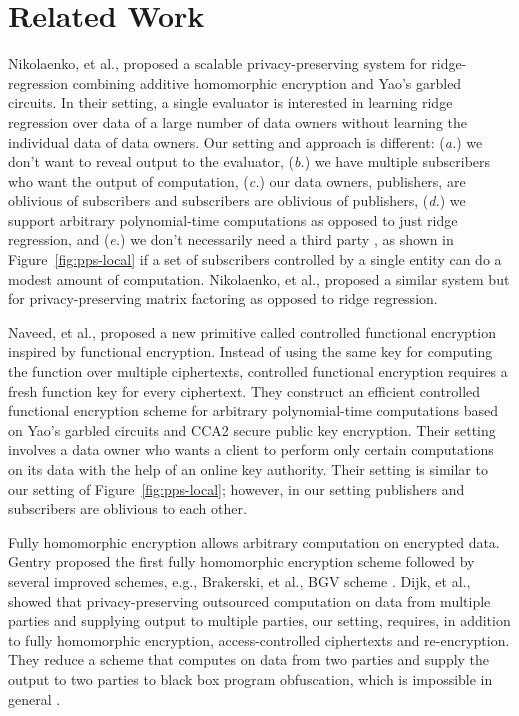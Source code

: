 \section{Related Work}
\label{sec:related}

Nikolaenko, et al., \cite{nikolaenko2013privacy} proposed a scalable
privacy-preserving system for ridge-regression combining additive homomorphic
encryption and Yao's garbled circuits.  In their setting, a single evaluator is
interested in learning ridge regression over data of a large number of data
owners without learning the individual data of data owners. Our setting and
approach is different: (\emph{a.}) we don't want to reveal output to the
evaluator, (\emph{b.}) we have multiple subscribers who want the output of
computation, (\emph{c.}) our data owners, publishers, are oblivious of
subscribers and subscribers are oblivious of publishers, (\emph{d.}) we support
arbitrary polynomial-time computations as opposed to just ridge regression, and
(\emph{e.}) we don't necessarily need a third party \garbler, as shown in
Figure~\ref{fig:pps-local} if a set of subscribers controlled by a single
entity can do a modest amount of computation. Nikolaenko, et
al.,\cite{nikolaenko2013privacy} proposed a similar system but for
privacy-preserving matrix factoring as opposed to ridge regression.

Naveed, et al., \cite{naveed2014controlled} proposed a new primitive called
controlled functional encryption inspired by functional encryption. Instead of
using the same key for computing the function over multiple ciphertexts,
controlled functional encryption requires a fresh function key for every
ciphertext. They construct an efficient controlled functional encryption scheme
for arbitrary polynomial-time computations based on Yao's garbled circuits and
CCA2 secure public key encryption. Their setting involves a data owner who
wants a client to perform only certain computations on its data with the help
of an online key authority. Their setting is similar to our setting of
Figure~\ref{fig:pps-local}; however, in our setting publishers and subscribers
are oblivious to each other.

Fully homomorphic encryption allows arbitrary computation on encrypted data.
Gentry proposed the first fully homomorphic encryption
scheme \cite{brakerski2011fully,gentry2009fully} followed by several
improved schemes, e.g., Brakerski, et al., BGV scheme
\cite{brakerski2014leveled}. Dijk, et al., \cite{van2010impossibility}
showed that privacy-preserving outsourced computation on data from multiple
parties and supplying output to multiple parties, our setting, requires, in
addition to fully homomorphic encryption, access-controlled ciphertexts and
re-encryption. They reduce a scheme that computes on data from two parties
and supply the output to two parties to black box program obfuscation, which
is impossible in general \cite{barak2001possibility}.
